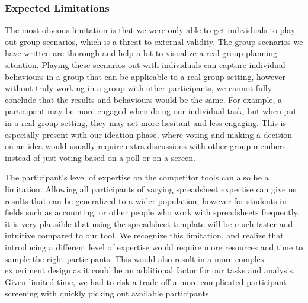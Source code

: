 \documentclass[12pt,a4paper]{article}
\begin{document}
\subsubsection{Expected Limitations}
\par
\indent
The most obvious limitation is that we were only able to get individuals to play out group scenarios, which is a threat to external validity. The group scenarios we have written are thorough and help a lot to visualize a real group planning situation. Playing these scenarios out with individuals can capture individual behaviours in a group that can be applicable to a real group setting, however without truly working in a group with other participants, we cannot fully conclude that the results and behaviours would be the same. For example, a participant may be more engaged when doing our individual task, but when put in a real group setting, they may act more hesitant and less engaging. This is especially present with our ideation phase, where voting and making a decision on an idea would usually require extra discussions with other group members instead of just voting based on a poll or on a screen. \newline

\par
\indent
The participant’s level of expertise on the competitor tools can also be a limitation. Allowing all participants of varying spreadsheet expertise can give us results that can be generalized to a wider population, however for students in fields such as accounting, or other people who work with spreadsheets frequently, it is very plausible that using the spreadsheet template will be much faster and intuitive compared to our tool. We recognize this limitation, and realize that introducing a different level of expertise would require more resources and time to sample the right participants. This would also result in a more complex experiment design as it could be an additional factor for our tasks and analysis. Given limited time, we had to risk a trade off a more complicated participant screening with quickly picking out available participants. \newline
\end{document}
